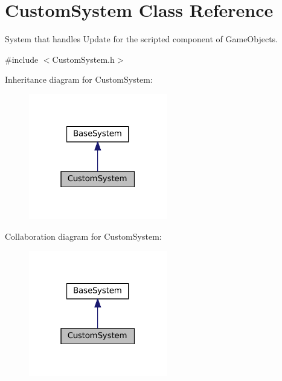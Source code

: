 \hypertarget{classCustomSystem}{}\section{Custom\+System Class Reference}
\label{classCustomSystem}


System that handles Update for the scripted component of Game\+Objects.  




{\ttfamily \#include $<$Custom\+System.\+h$>$}



Inheritance diagram for Custom\+System\+:
\nopagebreak
\begin{figure}[H]
\begin{center}
\leavevmode
\includegraphics[width=171pt]{classCustomSystem__inherit__graph}
\end{center}
\end{figure}


Collaboration diagram for Custom\+System\+:
\nopagebreak
\begin{figure}[H]
\begin{center}
\leavevmode
\includegraphics[width=171pt]{classCustomSystem__coll__graph}
\end{center}
\end{figure}
